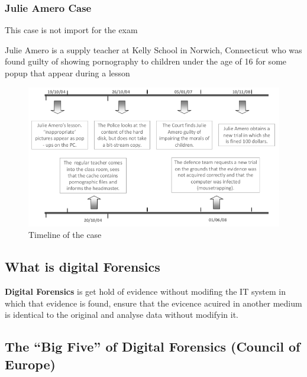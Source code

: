 \newpage
\subsubsection{Julie Amero Case}

\begin{boxH}
    This case is not import for the exam
\end{boxH}

Julie Amero is a supply teacher at Kelly School in Norwich, Connecticut
who was found guilty of showing pornography to children under the age of 16
for some popup that appear during a lesson

\begin{figure}[h!]
    \centering
    \includegraphics[width=1\textwidth]{img/amero_case.png}
    \caption{Timeline of the case}
    \label{fig:amero case}
 \end{figure}


\subsection{What is digital Forensics}

\textbf{Digital Forensics} is get hold of evidence without modifing the IT 
system in which that evidence is found, ensure that the 
evicence acuired in another medium is identical to the original and 
analyse data without modifyin it.

\subsection{The “Big Five” of Digital Forensics (Council of Europe)}

